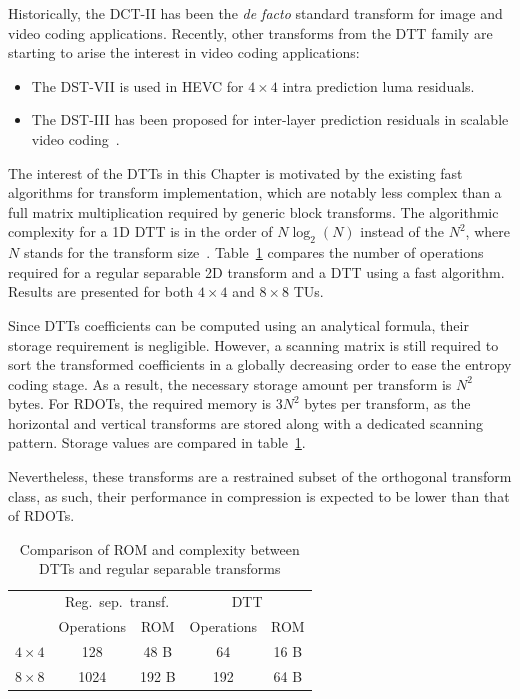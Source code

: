 \documentclass[11pt,a4paper,openright,twoside]{book}
\numberwithin{equation}{section} %
\numberwithin{figure}{section} %
\numberwithin{table}{section} %
\begin{document}
Historically, the \ac{DCT}-II has been the \emph{de facto} standard transform
for image and video coding applications.
Recently, other transforms from the \ac{DTT} family are starting to arise the
interest in video coding applications:
\begin{itemize}
	\item The \ac{DST}-VII is used in \ac{HEVC} for $4\times4$ intra
		prediction luma residuals.
	\item The \ac{DST}-III has been proposed for inter-layer prediction
		residuals in scalable video
		coding~\cite{guo-14-transform-inter-layer-scalable}.
\end{itemize}

The interest of the \acp{DTT} in this Chapter is motivated by the existing
fast algorithms for transform implementation, which are notably less complex
than a full matrix multiplication required by generic block transforms.
The algorithmic complexity for a 1D \ac{DTT} is in the order of $N\log_2(N)$
instead of the $N^2$, where $N$ stands for the transform
size~\cite{puschel-08-algorithms-dct-dst}.
Table~\ref{tab:comparison_dtt_separable} compares the number of operations
required for a regular separable 2D transform and a \ac{DTT} using a fast
algorithm.
Results are presented for both $4\times4$ and $8\times8$ \acp{TU}.

Since \acp{DTT} coefficients can be computed using an analytical formula,
their storage requirement is negligible.
However, a scanning matrix is still required to sort the transformed
coefficients in a globally decreasing order to ease the entropy coding stage.
As a result, the necessary storage amount per transform is $N^2$ bytes.
For \acp{RDOT}, the required memory is $3N^2$ bytes per transform, as the
horizontal and vertical transforms are stored along with a dedicated scanning
pattern.
Storage values are compared in table~\ref{tab:comparison_dtt_separable}.

Nevertheless, these transforms are a restrained subset of the orthogonal
transform class, as such, their performance in compression is expected to be
lower than that of \acp{RDOT}.

\begin{table}[tb]
	\centering
	\small
	\begin{tabular}{c|cc|cc}
		\multirow{2}{2cm}{\diagbox{Size}{Type}} &
		\multicolumn{2}{c|}{Reg.\ sep.\ transf.} &
		\multicolumn{2}{c}{\acs{DTT}} \\
		& Operations & \acs{ROM} & Operations & \acs{ROM} \\
		\hline
		$4\times4$ &  128 &  48 B &  64 & 16 B \\
		$8\times8$ & 1024 & 192 B & 192 & 64 B \\
	\end{tabular}
	\caption{Comparison of \acs{ROM} and complexity between \acsp{DTT} and
	regular separable transforms}
	\label{tab:comparison_dtt_separable}
\end{table}
\end{document}
